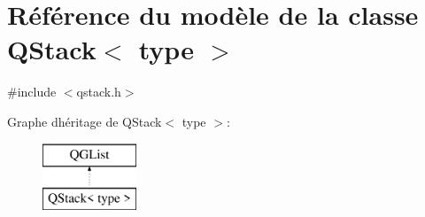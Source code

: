 \hypertarget{class_q_stack}{}\section{Référence du modèle de la classe Q\+Stack$<$ type $>$}
\label{class_q_stack}


{\ttfamily \#include $<$qstack.\+h$>$}

Graphe d\textquotesingle{}héritage de Q\+Stack$<$ type $>$\+:\begin{figure}[H]
\begin{center}
\leavevmode
\includegraphics[height=2.000000cm]{class_q_stack}
\end{center}
\end{figure}
